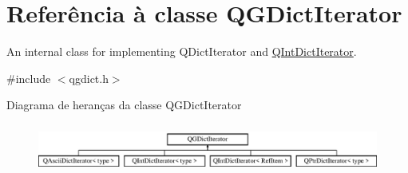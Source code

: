 \hypertarget{class_q_g_dict_iterator}{\section{Referência à classe Q\-G\-Dict\-Iterator}
\label{class_q_g_dict_iterator}
}


An internal class for implementing Q\-Dict\-Iterator and \hyperlink{class_q_int_dict_iterator}{Q\-Int\-Dict\-Iterator}.  




{\ttfamily \#include $<$qgdict.\-h$>$}

Diagrama de heranças da classe Q\-G\-Dict\-Iterator\begin{figure}[H]
\begin{center}
\leavevmode
\includegraphics[height=1.647059cm]{class_q_g_dict_iterator}
\end{center}
\end{figure}
